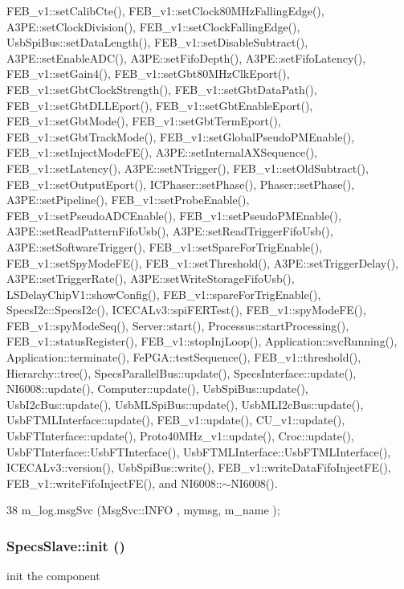 FEB\_\-v1::setCalibCte(), FEB\_\-v1::setClock80MHzFallingEdge(), A3PE::setClockDivision(), FEB\_\-v1::setClockFallingEdge(), UsbSpiBus::setDataLength(), FEB\_\-v1::setDisableSubtract(), A3PE::setEnableADC(), A3PE::setFifoDepth(), A3PE::setFifoLatency(), FEB\_\-v1::setGain4(), FEB\_\-v1::setGbt80MHzClkEport(), FEB\_\-v1::setGbtClockStrength(), FEB\_\-v1::setGbtDataPath(), FEB\_\-v1::setGbtDLLEport(), FEB\_\-v1::setGbtEnableEport(), FEB\_\-v1::setGbtMode(), FEB\_\-v1::setGbtTermEport(), FEB\_\-v1::setGbtTrackMode(), FEB\_\-v1::setGlobalPseudoPMEnable(), FEB\_\-v1::setInjectModeFE(), A3PE::setInternalAXSequence(), FEB\_\-v1::setLatency(), A3PE::setNTrigger(), FEB\_\-v1::setOldSubtract(), FEB\_\-v1::setOutputEport(), ICPhaser::setPhase(), Phaser::setPhase(), A3PE::setPipeline(), FEB\_\-v1::setProbeEnable(), FEB\_\-v1::setPseudoADCEnable(), FEB\_\-v1::setPseudoPMEnable(), A3PE::setReadPatternFifoUsb(), A3PE::setReadTriggerFifoUsb(), A3PE::setSoftwareTrigger(), FEB\_\-v1::setSpareForTrigEnable(), FEB\_\-v1::setSpyModeFE(), FEB\_\-v1::setThreshold(), A3PE::setTriggerDelay(), A3PE::setTriggerRate(), A3PE::setWriteStorageFifoUsb(), LSDelayChipV1::showConfig(), FEB\_\-v1::spareForTrigEnable(), SpecsI2c::SpecsI2c(), ICECALv3::spiFERTest(), FEB\_\-v1::spyModeFE(), FEB\_\-v1::spyModeSeq(), Server::start(), Processus::startProcessing(), FEB\_\-v1::statusRegister(), FEB\_\-v1::stopInjLoop(), Application::svcRunning(), Application::terminate(), FePGA::testSequence(), FEB\_\-v1::threshold(), Hierarchy::tree(), SpecsParallelBus::update(), SpecsInterface::update(), NI6008::update(), Computer::update(), UsbSpiBus::update(), UsbI2cBus::update(), UsbMLSpiBus::update(), UsbMLI2cBus::update(), UsbFTMLInterface::update(), FEB\_\-v1::update(), CU\_\-v1::update(), UsbFTInterface::update(), Proto40MHz\_\-v1::update(), Croc::update(), UsbFTInterface::UsbFTInterface(), UsbFTMLInterface::UsbFTMLInterface(), ICECALv3::version(), UsbSpiBus::write(), FEB\_\-v1::writeDataFifoInjectFE(), FEB\_\-v1::writeFifoInjectFE(), and NI6008::$\sim$NI6008().


\begin{DoxyCode}
38 { m_log.msgSvc (MsgSvc::INFO    , mymsg, m_name ); }
\end{DoxyCode}
\hypertarget{classSpecsSlave_ab34b5117373a334027d3a5cf33287bb6}{
\subsubsection[{init}]{ SpecsSlave::init ()}}
\label{classSpecsSlave_ab34b5117373a334027d3a5cf33287bb6}
init the component


